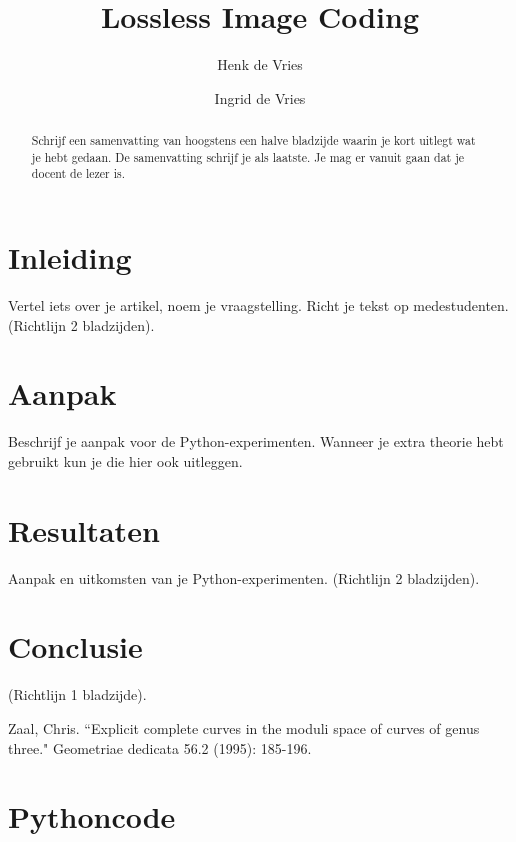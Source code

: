 \documentclass[complatex]{uvamath}
\title{Lossless Image Coding}
\author[henk@science.uva.nl, 6127901]{Henk de Vries}
\author[ingrid@science.uva.nl, 6123102]{Ingrid de Vries}
\begin{document}
\maketitle

\begin{abstract}
Schrijf een samenvatting van hoogstens een halve bladzijde waarin je kort uitlegt wat je hebt gedaan. De samenvatting schrijf je als laatste. Je mag er vanuit gaan dat je docent de lezer is.
\end{abstract}

\tableofcontents

\chapter{Inleiding}
Vertel iets over je artikel, noem je vraagstelling. Richt je tekst op medestudenten. (Richtlijn 2 bladzijden).

\chapter{Aanpak}
Beschrijf je aanpak voor de Python-experimenten. Wanneer je extra theorie hebt gebruikt kun je die hier ook uitleggen. 

\chapter{Resultaten}
Aanpak en uitkomsten van je Python-experimenten. (Richtlijn 2 bladzijden).

\chapter{Conclusie}
(Richtlijn 1 bladzijde).

\clearpage%
\begin{thebibliography}{}
Zaal, Chris. ``Explicit complete curves in the moduli space of curves of genus three." Geometriae dedicata 56.2 (1995): 185-196.
\end{thebibliography}

\appendix

\chapter{Pythoncode}
\end{document}
